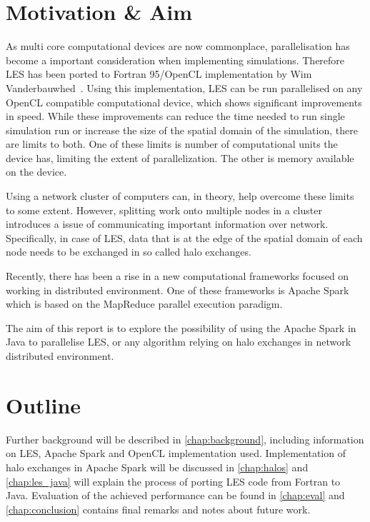 \documentclass{l4proj}
\begin{document}
\section{Motivation \& Aim}

As multi core computational devices are now commonplace, parallelisation has become
a important consideration when implementing simulations. Therefore LES has been
ported to Fortran 95/OpenCL implementation by Wim Vanderbauwhed~\cite{les_wim}. Using this implementation,
LES can be run parallelised on any OpenCL compatible computational device, which shows
significant improvements in speed. While these improvements can reduce the time needed to
run single simulation run or increase the size of the spatial domain of the simulation,
there are limits to both. One of these limits is number of computational units the device has,
limiting the extent of parallelization. The other is memory available on the device.

Using a network cluster of computers can, in theory, help overcome these limits to some extent.
However, splitting work onto multiple nodes in a cluster introduces a issue of communicating
important information over network. Specifically, in case of LES, data that is at the edge of
the spatial domain of each node needs to be exchanged in so called halo exchanges.

Recently, there has been a rise in a new computational frameworks focused on working in
distributed environment. One of these frameworks is Apache Spark which is based on
the MapReduce parallel execution paradigm.

The aim of this report is to explore the possibility of using the Apache Spark in Java to parallelise
LES, or any algorithm relying on halo exchanges in network distributed environment.

\section{Outline}

Further background will be described in \autoref{chap:background}, including information
on LES, Apache Spark and OpenCL implementation used. Implementation of halo exchanges in 
Apache Spark will be discussed in \autoref{chap:halos} and \autoref{chap:les_java} will
explain the process of porting LES code from Fortran to Java. Evaluation of the achieved
performance can be found in \autoref{chap:eval} and \autoref{chap:conclusion} contains
final remarks and notes about future work.
\end{document}
